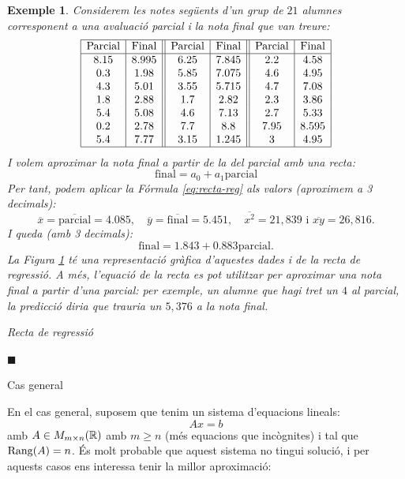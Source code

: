 \documentclass[
  11pt,
]{book}
\makeatletter
\numberwithin{dummy}{section}
\theoremstyle{maincolornumbox}
\theoremstyle{blacknumex}
\newtheorem{exampleT}{Exemple}[chapter]
\theoremstyle{blacknumbox}
\theoremstyle{maincolornum}
\newenvironment{example}{\begin{exampleT}}{\hfill{\tiny\ensuremath{\blacksquare}}\end{exampleT}}
\renewcommand{\subsection}{\@startsection {subsection}{2}{\z@}
{-3ex \@plus -0.1ex \@minus -.4ex}
{0.5ex \@plus.2ex }
{\normalfont\sffamily\bfseries}}
\newlength\esp
\makeatother
\begin{document}
\begin{example}

Considerem les notes següents d'un grup de \(21\) alumnes corresponent a
una avaluació parcial i la nota final que van treure:
\[\begin{array}{|c|c||c|c||c|c|}
\hline\text{Parcial} & \text{Final} & \text{Parcial} & \text{Final} & \text{Parcial} & \text{Final}  \\ \hline
8.15 & 8.995 & 6.25 & 7.845 & 2.2 & 4.58 \\
0.3 & 1.98 & 5.85 & 7.075 & 4.6 &4.95 \\
4.3&5.01 & 3.55 & 5.715 & 4.7 & 7.08\\
1.8&2.88 & 1.7 & 2.82 & 2.3 & 3.86\\
5.4&5.08 & 4.6 & 7.13 & 2.7 &5.33 \\
0.2 &2.78 & 7.7 & 8.8 & 7.95 &8.595\\
5.4 & 7.77 & 3.15 &1.245 & 3 &4.95\\ \hline
\end{array}\] I volem aproximar la nota final a partir de la del parcial
amb una recta: \[\text{final}= a_0 + a_1 \text{parcial}\] Per tant,
podem aplicar la Fórmula
\eqref{eq:recta-reg} als valors (aproximem a 3 decimals):
\[\overline{x}=\overline{\text{parcial}}= 4.085, \quad
\overline{y}=\overline{\text{final}}= 5.451, \quad
\overline{x^2}=21,839 \text{ i }
\overline{xy}= 26,816.\] I queda (amb 3 decimals):
\[\text{final}= 1.843 + 0.883 \text{parcial}.\] La Figura
\hyperref[fig:recta-reg]{1} té
una representació gràfica d'aquestes dades i de la recta de regressió. A
més, l'equació de la recta es pot utilitzar per aproximar una nota final
a partir d'una parcial: per exemple, un alumne que hagi tret un \(4\) al
parcial, la predicció diria que trauria un \(5,376\) a la nota final.

Recta de regressió\label{fig:recta-reg}{}

\end{example}

\subsection{Cas general}\label{cas-general}

En el cas general, suposem que tenim un sistema d'equacions lineals:
\[A x = b\] amb \(A\in M_{m\times n}(\mathbb{R})\) amb \(m\geq n\) (més equacions
que incògnites) i tal que \(\operatorname{Rang}(A)=n\). És molt probable que aquest
sistema no tingui solució, i per aquests casos ens interessa tenir la
millor aproximació:
\end{document}
